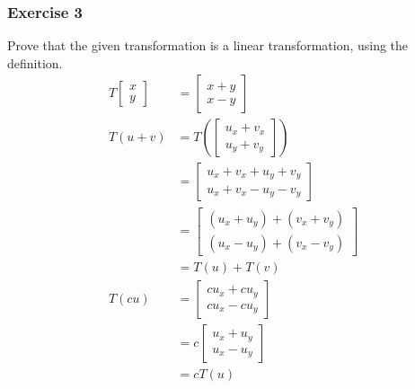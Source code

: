 \documentclass[letterpaper, 12pt]{math}
\begin{document}
\subsubsection*{Exercise 3}
Prove that the given transformation is a linear transformation, using the
definition.
\begin{align*}
  T\begin{bmatrix}x \\ y\end{bmatrix} &=
    \begin{bmatrix}x+y \\ x-y\end{bmatrix} \\
  T(u+v) &= T\left(\begin{bmatrix}
    u_x+v_x \\
    u_y+v_y
  \end{bmatrix}\right) \\
  &= \begin{bmatrix}
    u_x+v_x+u_y+v_y \\
    u_x+v_x-u_y-v_y
  \end{bmatrix} \\
  &= \begin{bmatrix}
    (u_x+u_y)+(v_x+v_y) \\
    (u_x-u_y)+(v_x-v_y)
  \end{bmatrix} \\
  &= T(u)+T(v) \\
  T(cu) &= \begin{bmatrix}
    cu_x+cu_y \\
    cu_x-cu_y
  \end{bmatrix} \\
  &= c\begin{bmatrix}
    u_x+u_y \\
    u_x-u_y
  \end{bmatrix} \\
  &= cT(u)
\end{align*}
\end{document}
